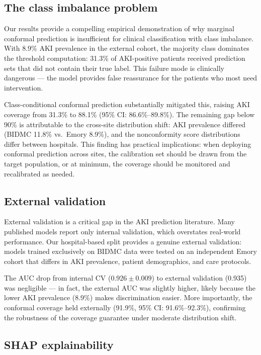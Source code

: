 \documentclass[12pt]{article}
\begin{document}
\subsection{The class imbalance problem}

Our results provide a compelling empirical demonstration of why
marginal conformal prediction is insufficient for clinical
classification with class imbalance.  With 8.9\% AKI prevalence
in the external cohort, the majority class dominates the threshold
computation: 31.3\% of AKI-positive patients received prediction
sets that did not contain their true label.  This failure mode is
clinically dangerous --- the model provides false reassurance for
the patients who most need intervention.

Class-conditional conformal prediction substantially mitigated
this, raising AKI coverage from 31.3\% to 88.1\% (95\% CI:
86.6\%--89.8\%).  The remaining gap below 90\% is attributable
to the cross-site distribution shift: AKI prevalence differed
(BIDMC 11.8\% vs.\ Emory 8.9\%), and the nonconformity score
distributions differ between hospitals.  This finding has
practical implications: when deploying conformal prediction across
sites, the calibration set should be drawn from the target
population, or at minimum, the coverage should be monitored and
recalibrated as needed.\cite{tibshirani2019conformal}

\subsection{External validation}

External validation is a critical gap in the AKI prediction
literature.  Many published models report only internal
validation, which overstates real-world performance.  Our
hospital-based split provides a genuine external validation:
models trained exclusively on BIDMC data were tested on an
independent Emory cohort that differs in AKI prevalence, patient
demographics, and care protocols.

The AUC drop from internal CV ($0.926 \pm 0.009$) to external
validation (0.935) was negligible --- in fact, the external AUC
was slightly higher, likely because the lower AKI prevalence
(8.9\%) makes discrimination easier.  More importantly, the
conformal coverage held externally (91.9\%, 95\% CI:
91.6\%--92.3\%), confirming the robustness of the coverage
guarantee under moderate distribution shift.

\subsection{SHAP explainability}
\end{document}
